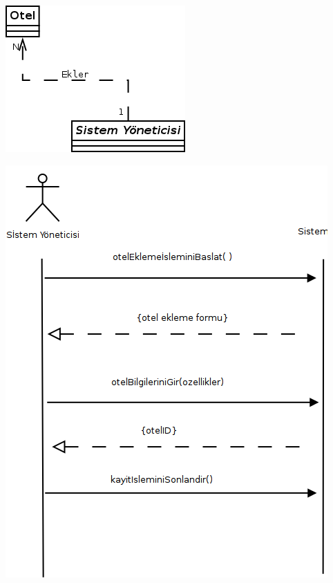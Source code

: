 \documentclass[12pt,a4paper]{report}
\begin{document}
\begin{center}
\includegraphics{dia/usecase4.png}
\end{center}

\newpage

\begin{center}
\includegraphics{dia/ssd-usecase4.png}
\end{center}

\newpage
\end{document}

